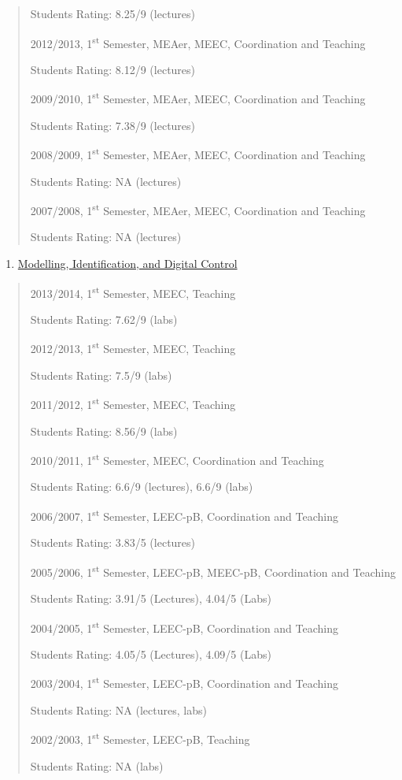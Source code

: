 \begin{quote}
Students Rating: 8.25/9 (lectures)

2012/2013, 1\textsuperscript{st} Semester, MEAer, MEEC, Coordination and
Teaching

Students Rating: 8.12/9 (lectures)

2009/2010, 1\textsuperscript{st} Semester, MEAer, MEEC, Coordination and
Teaching

Students Rating: 7.38/9 (lectures)

2008/2009, 1\textsuperscript{st} Semester, MEAer, MEEC, Coordination and
Teaching

Students Rating: NA (lectures)

2007/2008, 1\textsuperscript{st} Semester, MEAer, MEEC, Coordination and
Teaching

Students Rating: NA (lectures)
\end{quote}

\begin{enumerate}
\def\labelenumi{\arabic{enumi}.}
\setcounter{enumi}{2}
\item
  \ul{Modelling, Identification, and Digital Control}
\end{enumerate}
\begin{quote}
2013/2014, 1\textsuperscript{st} Semester, MEEC, Teaching

Students Rating: 7.62/9 (labs)

2012/2013, 1\textsuperscript{st} Semester, MEEC, Teaching

Students Rating: 7.5/9 (labs)

2011/2012, 1\textsuperscript{st} Semester, MEEC, Teaching

Students Rating: 8.56/9 (labs)

2010/2011, 1\textsuperscript{st} Semester, MEEC, Coordination and
Teaching

Students Rating: 6.6/9 (lectures), 6.6/9 (labs)

2006/2007, 1\textsuperscript{st} Semester, LEEC-pB, Coordination and
Teaching

Students Rating: 3.83/5 (lectures)

2005/2006, 1\textsuperscript{st} Semester, LEEC-pB, MEEC-pB,
Coordination and Teaching

Students Rating: 3.91/5 (Lectures), 4.04/5 (Labs)

2004/2005, 1\textsuperscript{st} Semester, LEEC-pB, Coordination and
Teaching

Students Rating: 4.05/5 (Lectures), 4.09/5 (Labs)

2003/2004, 1\textsuperscript{st} Semester, LEEC-pB, Coordination and
Teaching

Students Rating: NA (lectures, labs)

2002/2003, 1\textsuperscript{st} Semester, LEEC-pB, Teaching

Students Rating: NA (labs)
\end{quote}

